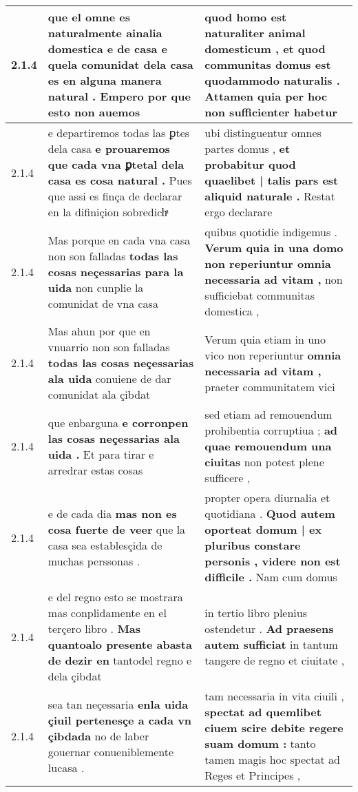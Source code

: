 \begin{tabular}{|p{1cm}|p{6.5cm}|p{6.5cm}|}
2.1.4 & que el omne es naturalmente ainalia domestica e de casa \textbf{ e quela comunidat dela casa es en alguna manera natural . } Empero por que esto non auemos & quod homo est naturaliter animal domesticum , \textbf{ et quod communitas domus est quodammodo naturalis . } Attamen quia per hoc non sufficienter habetur \\\hline
2.1.4 & e departiremos todas las ꝑtes dela casa \textbf{ e prouaremos que cada vna ꝑtetal dela casa es cosa natural . } Pues que assi es finça de declarar en la difiniçion sobredichͣ & ubi distinguentur omnes partes domus , \textbf{ et probabitur quod quaelibet | talis pars est aliquid naturale . } Restat ergo declarare \\\hline
2.1.4 & Mas porque en cada vna casa non son falladas \textbf{ todas las cosas neçessarias para la uida } non cunplie la comunidat de vna casa & quibus quotidie indigemus . \textbf{ Verum quia in una domo non reperiuntur omnia necessaria ad vitam , } non sufficiebat communitas domestica , \\\hline
2.1.4 & Mas ahun por que en vnuarrio non son falladas \textbf{ todas las cosas neçessarias ala uida } conuiene de dar comunidat ala çibdat & Verum quia etiam in uno vico non reperiuntur \textbf{ omnia necessaria ad vitam , } praeter communitatem vici \\\hline
2.1.4 & que enbarguna \textbf{ e corronpen las cosas neçessarias ala uida . } Et para tirar e arredrar estas cosas & sed etiam ad remouendum prohibentia corruptiua ; \textbf{ ad quae remouendum una ciuitas } non potest plene sufficere , \\\hline
2.1.4 & e de cada dia \textbf{ mas non es cosa fuerte de veer } que la casa sea establesçida de muchas perssonas . & propter opera diurnalia et quotidiana . \textbf{ Quod autem oporteat domum | ex pluribus constare personis , videre non est difficile . } Nam cum domus \\\hline
2.1.4 & e del regno esto se mostrara mas conplidamente en el terçero libro . \textbf{ Mas quantoalo presente abasta de dezir en } tantodel regno e dela çibdat & in tertio libro plenius ostendetur . \textbf{ Ad praesens autem sufficiat } in tantum tangere de regno et ciuitate , \\\hline
2.1.4 & sea tan neçessaria \textbf{ enla uida çiuil pertenesçe a cada vn çibdada } no de laber gouernar conueniblemente lucasa . & tam necessaria in vita ciuili , \textbf{ spectat ad quemlibet ciuem scire debite regere suam domum : } tanto tamen magis hoc spectat ad Reges et Principes , \\\hline

\end{tabular}
